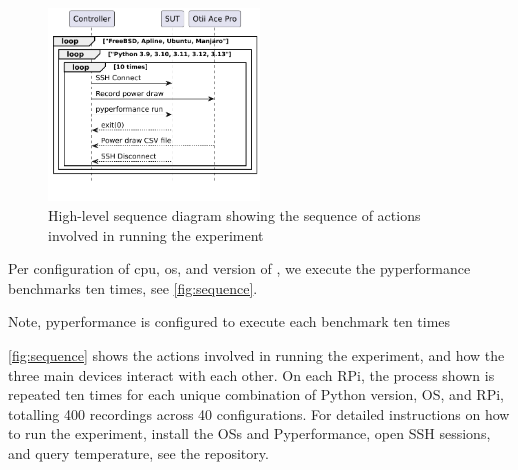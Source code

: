 
\begin{figure}
    \centering
    \includegraphics[width=0.5\textwidth]{images/scenario.pdf}
    \caption{High-level sequence diagram showing the sequence of actions involved in running the experiment}
    \label{fig:sequence}
\end{figure}

Per configuration of \gls{cpu}, \gls{os}, and version of \python, we execute the \gls{pyperformance} benchmarks ten times, see \autoref{fig:sequence}.




Note, \gls{pyperformance} is configured to execute each benchmark ten times


\autoref{fig:sequence} shows the actions involved in running the experiment, and how the three main devices interact with each other.
On each RPi, the process shown is repeated ten times for each unique combination of Python version, OS, and RPi, totalling 400 recordings across 40 configurations.
For detailed instructions on how to run the experiment, install the OSs and Pyperformance, open SSH sessions, and query temperature, see the repository.

